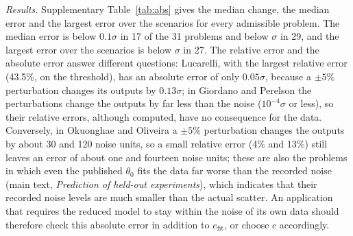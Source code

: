 \emph{Results.} Supplementary Table~\ref{tab:abs} gives the median change, the median error and the largest error over the scenarios for every admissible problem. The median error is below $0.1\sigma$ in 17 of the 31 problems and below $\sigma$ in 29, and the largest error over the scenarios is below $\sigma$ in 27. The relative error and the absolute error answer different questions: Lucarelli, with the largest relative error (43.5\%, on the threshold), has an absolute error of only $0.05\sigma$, because a $\pm5\%$ perturbation changes its outputs by $0.13\sigma$; in Giordano and Perelson the perturbations change the outputs by far less than the noise ($10^{-4}\sigma$ or less), so their relative errors, although computed, have no consequence for the data. Conversely, in Okuonghae and Oliveira a $\pm5\%$ perturbation changes the outputs by about 30 and 120 noise units, so a small relative error (4\% and 13\%) still leaves an error of about one and fourteen noise units; these are also the problems in which even the published $\theta_0$ fits the data far worse than the recorded noise (main text, \emph{Prediction of held-out experiments}), which indicates that their recorded noise levels are much smaller than the actual scatter. An application that requires the reduced model to stay within the noise of its own data should therefore check this absolute error in addition to $e_{\mathrm{fit}}$, or choose $c$ accordingly.

{\small

}
